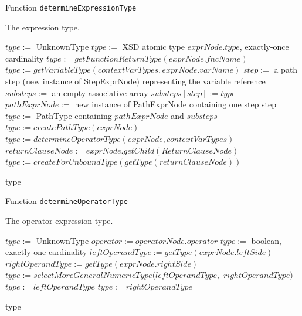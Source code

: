 \begin{algorithm}
\caption{Function \texttt{determineExpressionType}}
\label{ALG_func_determineExpressionType}
\begin{algorithmic}[1]
\ENSURE The expression type.

\STATE $type :=$ UnknownType
     \STATE $type :=$ XSD atomic type $exprNode.type$, exactly-once cardinality
     \STATE $type := getFunctionReturnType(exprNode.fncName)$
     \STATE $type := getVariableType(contextVarTypes, exprNode.varName)$
         \STATE $step :=$ a path step (new instance of StepExprNode) representing the variable reference
		 \STATE $substeps :=$ an empty associative array         
         \STATE $substeps[step] := type$
         \STATE $pathExprNode :=$ new instance of PathExprNode containing one step step
         \STATE $type :=$ PathType containing $pathExprNode$ and $substeps$
     \ENDIF
{}
     \STATE $type := createPathType(exprNode)$
     \STATE $type := determineOperatorType(exprNode, contextVarTypes)$
     \STATE $returnClauseNode := exprNode.getChild(ReturnClauseNode)$
     \STATE $type := createForUnboundType(getType(returnClauseNode))$
\ENDIF

\RETURN type
\end{algorithmic}
\end{algorithm}

\begin{algorithm}
\caption{Function \texttt{determineOperatorType}}
\label{ALG_func_determineOperatorType}
\begin{algorithmic}[1]
\ENSURE The operator expression type.

\STATE $type :=$ UnknownType
\STATE $operator := operatorNode.operator$
    \STATE $type :=$ boolean, exactly-one cardinality
    \STATE $leftOperandType := getType(exprNode.leftSide)$
    \STATE $rightOperandType := getType(exprNode.rightSide)$
        \STATE $type := selectMoreGeneralNumericType(leftOperandType,$ $rightOperandType)$
        \STATE $type := leftOperandType$
        \STATE $type := rightOperandType$
    \ENDIF
\ENDIF

\RETURN type
\end{algorithmic}
\end{algorithm}

